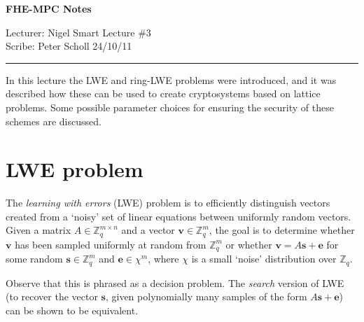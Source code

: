 \documentclass[11pt]{article}
\begin{document}
\thispagestyle{empty}


\begin{center}
\bf\large FHE-MPC Notes
\end{center}

\noindent
Lecturer: Nigel Smart               %
\hfill
Lecture \#3               %
\\
Scribe: Peter Scholl                 %
\hfill
24/10/11                         %

\noindent
\rule{\textwidth}{1pt}

\medskip


\newcommand{\mb}[1] {\mathbf{#1}}
\newcommand{\Norm}[1]{\Vert #1 \Vert}
\newcommand{\round}[1]{\lceil #1 \rfloor}


In this lecture the LWE and ring-LWE problems were introduced, and it
was described how these can be used to create cryptosystems based
on lattice problems. Some possible parameter choices for ensuring the
security of these schemes are discussed.

\section{LWE problem}

The \textit{learning with errors} (LWE) problem is to efficiently distinguish
vectors created from a `noisy' set of linear equations between uniformly random
vectors.
Given a matrix
$A \in \mathbb{Z}_q^{m \times n}$ and a vector $\mb{v} \in \mathbb{Z}_q^m$, the
goal is to determine whether $\mb{v}$ has been sampled uniformly at random from
$\mathbb{Z}_q^m$ or whether $\mb{v} = A\mb{s} + \mb{e}$ for some random $\mb{s} \in \mathbb{Z}_q^m$ and
$\mb{e} \in \chi^m$, where $\chi$ is a small `noise' distribution over $\mathbb{Z}_q$.

Observe that this is phrased as a decision problem. The \textit{search} version
of LWE (to recover the vector $\mb{s}$, given polynomially many samples of
the form $A\mb{s} + \mb{e}$) can be shown to be equivalent.
\end{document}
